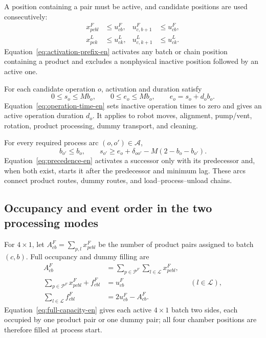 \documentclass[journal]{IEEEtran}
\begin{document}
A position containing a pair must be active, and candidate positions are used consecutively:
\begin{equation}
\begin{aligned}
x^F_{pcbl}&\le u^F_{cb}, &u^F_{c,b+1}&\le u^F_{cb},\\
x^L_{pck}&\le u^L_{ck}, &u^L_{c,k+1}&\le u^L_{ck}.
\end{aligned}
\label{eq:activation-prefix-en}
\end{equation}
Equation~\eqref{eq:activation-prefix-en} activates any batch or chain position containing a product and excludes a nonphysical inactive position followed by an active one.

For each candidate operation $o$, activation and duration satisfy
\begin{equation}
0\le s_o\le Mb_o,\qquad
0\le e_o\le Mb_o,\qquad
e_o=s_o+d_ob_o.
\label{eq:operation-time-en}
\end{equation}
Equation~\eqref{eq:operation-time-en} sets inactive operation times to zero and gives an active operation duration $d_o$. It applies to robot moves, alignment, pump/vent, rotation, product processing, dummy transport, and cleaning.

For every required process arc $(o,o')\in\mathcal A$,
\begin{equation}
b_{o'}\le b_o,\qquad
s_{o'}\ge e_o+\delta_{oo'}-M(2-b_o-b_{o'}).
\label{eq:precedence-en}
\end{equation}
Equation~\eqref{eq:precedence-en} activates a successor only with its predecessor and, when both exist, starts it after the predecessor and minimum lag. These arcs connect product routes, dummy routes, and load--process--unload chains.

\subsection{Occupancy and event order in the two processing modes}

For $4\times1$, let $A^F_{cb}=\sum_{p,l}x^F_{pcbl}$ be the number of product pairs assigned to batch $(c,b)$. Full occupancy and dummy filling are
\begin{equation}
\begin{aligned}
A^F_{cb}&=\sum_{p\in\mathcal P^F}\sum_{l\in\mathcal L}x^F_{pcbl},\\
\sum_{p\in\mathcal P^F}x^F_{pcbl}+f^F_{cbl}&=u^F_{cb}
&& (l\in\mathcal L),\\
\sum_{l\in\mathcal L}f^F_{cbl}&=2u^F_{cb}-A^F_{cb}.
\end{aligned}
\label{eq:full-capacity-en}
\end{equation}
Equation~\eqref{eq:full-capacity-en} gives each active $4\times1$ batch two sides, each occupied by one product pair or one dummy pair; all four chamber positions are therefore filled at process start.
\end{document}
